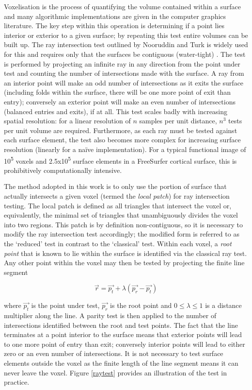 Voxelisation is the process of quantifying the volume contained within a surface and many algorithmic implementations are given in the computer graphics literature. The key step within this operation is determining if a point lies interior or exterior to a given surface; by repeating this test entire volumes can be built up. The ray intersection test outlined by Nooruddin and Turk is widely used for this and requires only that the surfaces be contiguous (water-tight) \cite{Nooruddin2003}. The test is performed by projecting an infinite ray in any direction from the point under test and counting the number of intersections made with the surface. A ray from an interior point will make an odd number of intersections as it exits the surface (including folds within the surface, there will be one more point of exit than entry); conversely an exterior point will make an even number of intersections (balanced entries and exits), if at all. This test scales badly with increasing spatial resolution: for a linear resolution of $n$ samples per unit distance, $n^3$ tests per unit volume are required. Furthermore, as each ray must be tested against each surface element, the test also becomes more complex for increasing surface resolution (linearly for a naïve implementation). For a typical functional image of 10\textsuperscript{5} voxels and 2.5x10\textsuperscript{5} surface elements in a FreeSurfer cortical surface, this is prohibitively computationally intensive.

The method adopted in this work is to only use the portion of surface that actually intersects a given voxel (termed the \textit{local patch}) for ray intersection testing. The local patch is defined as all triangles that intersect the voxel or, equivalently, the minimal set of triangles that unambiguously divides the voxel into two regions. This patch is by definition non-contiguous, so it is necessary to modify the ray intersection test accordingly; the modified form is referred to as the ‘reduced’ test in contrast to the ‘classical’ test. Within each voxel, a \textit{root point} that is known to lie within the surface is identified via the classical ray test. Any other point within the voxel may then be tested by projecting the finite line segment 

\begin{equation}
\vec{r} = \vec{p_t} + \lambda(\vec{p_r} - \vec{p_t})
\end{equation} 

where $\vec{p_t}$ is the point under test, $\vec{p_r}$ is the root point and $0 \leq \lambda \leq 1$ is a distance multiplier along the line. A parity test is then applied to the number of intersections identified between the root and test points. The fact that the line terminates at a point interior to the surface means that exterior points will lead to one more point of entry than exit; conversely interior points will lead to either zero or an even number of intersections. It is not necessary to test surface elements outside the voxel as the finite length of the line segment means it can never leave the voxel. Figure \ref{raytest} provides an illustration of the test in practice. 

